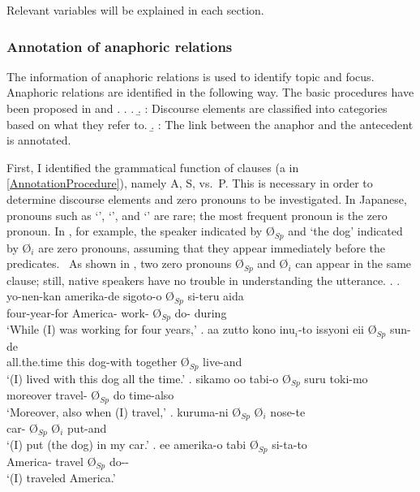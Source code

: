 Relevant variables will be explained in each section.

\subsubsection{Annotation of anaphoric relations}\label{FW:Cor:AnaRel}

The information of anaphoric relations is used
to identify topic and focus.
Anaphoric relations are identified in the following way.
The basic procedures have been proposed in  and .
\ex.\label{AnnotationProcedure} 
	\a. 
	\b. : Discourse elements are classified into categories based on what they refer to.
	\b. :
		The link between the anaphor and the antecedent is annotated.


First,
I identified the grammatical function of clauses (a in \ref{AnnotationProcedure}),
namely A, S, vs.~P.
This is necessary in order to determine discourse elements and zero pronouns to be investigated.
In Japanese,
pronouns such as  `',  `', and  `' are rare;
the most frequent pronoun is the zero pronoun.
In \Next,
for example, the speaker indicated by {\O$_{Sp}$} and `the dog' indicated by {\O$_{i}$} are zero pronouns,
assuming that they appear immediately before the predicates.%
	\
As shown in \Next[d],
two zero pronouns {\O$_{Sp}$} and {\O$_{i}$} can appear in the same clause;
still, native speakers have no trouble in understanding the utterance.
\ex. \ag. yo-nen-kan amerika-de sigoto-o {\O$_{Sp}$} si-teru aida \\
			four-year-for America- work- {\O$_{Sp}$} do- during \\
			`While (I) was working for four years,'
	\bg. aa zutto kono inu$_{i}$-to issyoni eii {\O$_{Sp}$} sun-de \\
		 all.the.time this dog-with together \ab{fl} {\O$_{Sp}$} live-and \\
		`(I) lived with this dog all the time.'
	\bg. sikamo oo tabi-o {\O$_{Sp}$} suru toki-mo \\
		moreover  travel- {\O$_{Sp}$} do time-also \\
		`Moreover, also when (I) travel,'
	\bg. kuruma-ni {\O$_{Sp}$} {\O$_{i}$} nose-te \\
		car- {\O$_{Sp}$} {\O$_{i}$} put-and \\
		`(I) put (the dog) in my car.'
	\bg. ee amerika-o tabi {\O$_{Sp}$} si-ta-to \\
		 America- travel {\O$_{Sp}$} do-- \\
		`(I) traveled America.'
		\hfill{}

